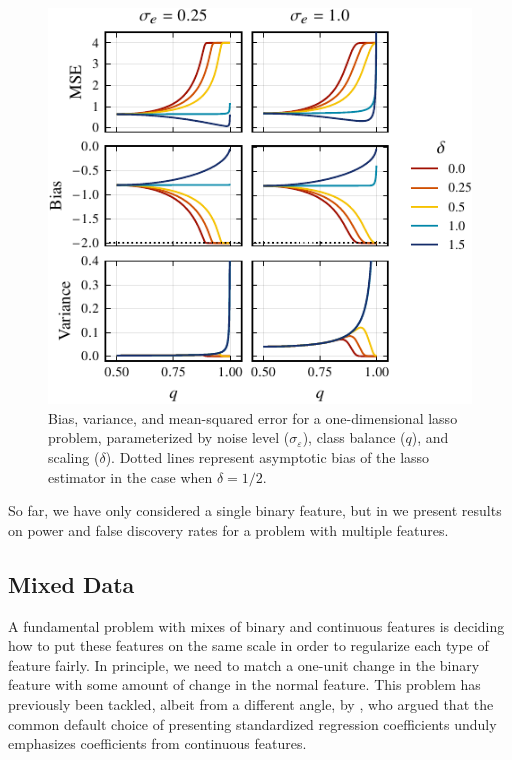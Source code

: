 \begin{figure}[htb]
  \centering
  \includegraphics[]{plots/binary_onedim_bias_var_lasso_small.pdf}
  \caption{%
    Bias, variance, and mean-squared error for a one-dimensional lasso problem,
    parameterized by noise level (\(\sigma_\varepsilon\)), class balance (\(q\)), and
    scaling (\(\delta\)). Dotted lines represent asymptotic bias of the lasso
    estimator in the case when \(\delta = 1/2\).}
  \label{fig:bias-var-onedim-lasso}
\end{figure}

So far, we have only considered a single binary feature, but in
 we present results on power and false discovery rates for a
problem with multiple features.

\subsection{Mixed Data}%
\label{sec:mixed-data}

A fundamental problem with mixes of binary and continuous features is deciding how to put these
features on the same scale in order to regularize each type of feature fairly. In
principle, we need to match a one-unit change in the binary feature with some amount of
change in the normal feature. This problem has previously been tackled, albeit from a
different angle, by \citet{gelman2008}, who argued that the common default choice of
presenting standardized regression coefficients unduly emphasizes coefficients from continuous
features.

